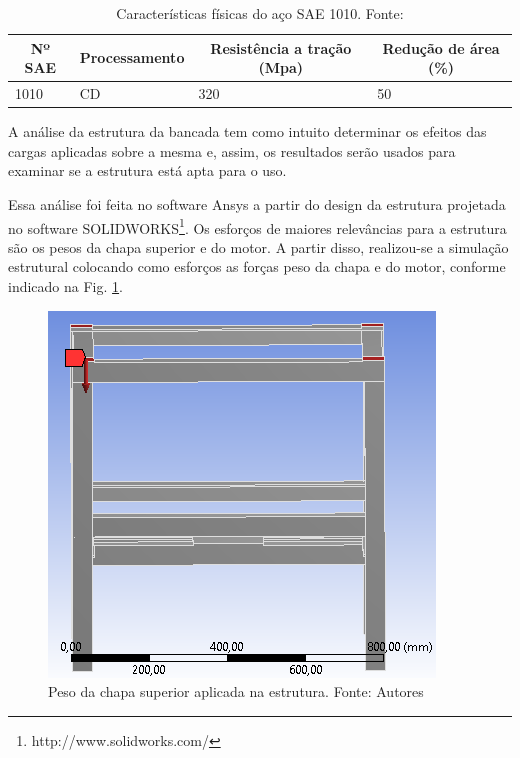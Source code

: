 \begin{table}[H]
\centering
\caption{Características físicas do aço SAE 1010. Fonte: \cite{shigley}}
\label{tab:caracteristicas_aco}
\begin{tabular}{|l|l|l|l|}
\hline
\multicolumn{1}{|c|}{\textbf{Nº SAE}} & \multicolumn{1}{c|}{\textbf{Processamento}} & \multicolumn{1}{c|}{\textbf{Resistência a tração (Mpa)}} & \multicolumn{1}{c|}{\textbf{Redução de área (\%)}} \\ \hline
1010                                  & CD                                          & 320                                                      & 50                                                 \\ \hline
\end{tabular}
\end{table}


    A análise da estrutura da bancada tem como intuito determinar os efeitos das cargas aplicadas sobre a mesma e, assim, os resultados serão usados para examinar se a estrutura está apta para o uso.

    Essa análise foi feita no software Ansys a partir do design da estrutura projetada no software SOLIDWORKS\footnote{http://www.solidworks.com/}. Os esforços de maiores relevâncias para a estrutura são os pesos da chapa superior e do motor. A partir disso, realizou-se a simulação estrutural colocando como esforços as forças peso da chapa e do motor, conforme indicado na Fig. \ref{fig:an_estrutural}.

  \begin{figure}[H]
      \centering
      \includegraphics[scale=0.7]{figuras/an_estrutural.png}
      \caption{Peso da chapa superior aplicada na estrutura. Fonte: Autores}
      \label{fig:an_estrutural}
      \end{figure}

